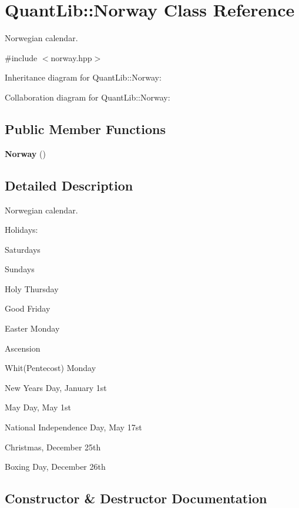 \section{Quant\+Lib\+:\+:Norway Class Reference}
\label{class_quant_lib_1_1_norway}


Norwegian calendar.  




{\ttfamily \#include $<$norway.\+hpp$>$}



Inheritance diagram for Quant\+Lib\+:\+:Norway\+:


Collaboration diagram for Quant\+Lib\+:\+:Norway\+:
\subsection*{Public Member Functions}
\begin{DoxyCompactItemize}
\item 
{\bf Norway} ()
\end{DoxyCompactItemize}


\subsection{Detailed Description}
Norwegian calendar. 

Holidays\+: 
\begin{DoxyItemize}
\item Saturdays 
\item Sundays 
\item Holy Thursday 
\item Good Friday 
\item Easter Monday 
\item Ascension 
\item Whit(\+Pentecost) Monday  
\item New Year\textquotesingle{}s Day, January 1st 
\item May Day, May 1st 
\item National Independence Day, May 17st 
\item Christmas, December 25th 
\item Boxing Day, December 26th 
\end{DoxyItemize}

\subsection{Constructor \& Destructor Documentation}

